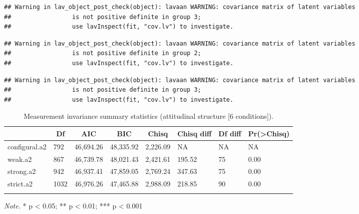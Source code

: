 \documentclass[
  english,
  man]{apa6}
\begin{document}
\begin{verbatim}
## Warning in lav_object_post_check(object): lavaan WARNING: covariance matrix of latent variables
##                 is not positive definite in group 3;
##                 use lavInspect(fit, "cov.lv") to investigate.
\end{verbatim}

\begin{verbatim}
## Warning in lav_object_post_check(object): lavaan WARNING: covariance matrix of latent variables
##                 is not positive definite in group 2;
##                 use lavInspect(fit, "cov.lv") to investigate.
\end{verbatim}

\begin{verbatim}
## Warning in lav_object_post_check(object): lavaan WARNING: covariance matrix of latent variables
##                 is not positive definite in group 3;
##                 use lavInspect(fit, "cov.lv") to investigate.
\end{verbatim}

\begin{table}[tbp]

\begin{center}
\begin{threeparttable}

\caption{\label{tab:measinv.siop2.att}Measurement invariance summary statistics (attitudinal structure [6 conditions]).}

\begin{tabular}{llllllll}
\toprule
 & \multicolumn{1}{c}{Df} & \multicolumn{1}{c}{AIC} & \multicolumn{1}{c}{BIC} & \multicolumn{1}{c}{Chisq} & \multicolumn{1}{c}{Chisq diff} & \multicolumn{1}{c}{Df diff} & \multicolumn{1}{c}{Pr(>Chisq)}\\
\midrule
configural.a2 & 792 & 46,694.26 & 48,335.92 & 2,226.09 & NA & NA & NA\\
weak.a2 & 867 & 46,739.78 & 48,021.43 & 2,421.61 & 195.52 & 75 & 0.00\\
strong.a2 & 942 & 46,937.41 & 47,859.05 & 2,769.24 & 347.63 & 75 & 0.00\\
strict.a2 & 1032 & 46,976.26 & 47,465.88 & 2,988.09 & 218.85 & 90 & 0.00\\
\bottomrule
\addlinespace
\end{tabular}

\begin{tablenotes}[para]
\normalsize{\textit{Note.} * p < 0.05; ** p < 0.01; *** p < 0.001}
\end{tablenotes}

\end{threeparttable}
\end{center}

\end{table}
\end{document}
